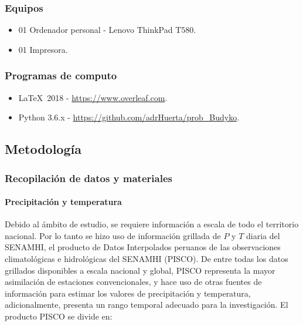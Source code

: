 \documentclass[12pt]{article}
\begin{document}
\subsubsection{Equipos}

\begin{itemize}
  \item 01 Ordenador personal - Lenovo ThinkPad T580.
  \item 01 Impresora.
\end{itemize}

\subsubsection{Programas de computo}

\begin{itemize}
  \item \LaTeX\  2018 - \url{https://www.overleaf.com}.
  \item Python 3.6.x - \url{https://github.com/adrHuerta/prob_Budyko}.
\end{itemize}

\subsection{Metodología}

\subsubsection{Recopilación de datos y materiales}

\paragraph{Precipitación y temperatura}\mbox{}

Debido al ámbito de estudio, se requiere información a escala de todo el territorio nacional. Por lo tanto se hizo uso de información grillada de $P$ y $T$ diaria del SENAMHI, el producto de Datos Interpolados peruanos de las observaciones climatológicas e hidrológicas del SENAMHI (PISCO). De entre todas los datos grillados disponibles a escala nacional y global, PISCO representa la mayor asimilación de estaciones convencionales, y hace uso de otras fuentes de información para estimar los valores de precipitación y temperatura, adicionalmente, presenta un rango temporal adecuado para la investigación. El producto PISCO se divide en:
\end{document}
